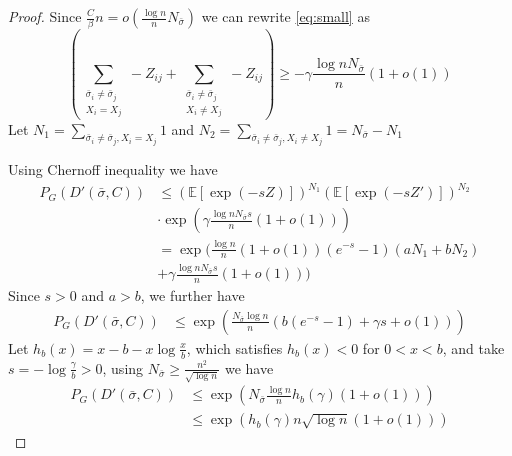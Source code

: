 \documentclass[entropy,article,submit,moreauthors,pdftex]{Definitions/mdpi}
\newcommand{\1}{\mathbbm{1}}
\begin{document}
\begin{proof}
	Since $\frac{C}{\beta} n = o(\frac{\log n}{n} N_{\bar{\sigma}})$ we can rewrite \eqref{eq:small} as
	\begin{equation}
	\left( \sum_{\substack{\bar{\sigma}_i  \neq \bar{\sigma}_j \\ X_i = X_j}} -Z_{ij}
	+ \sum_{\substack{\bar{\sigma}_i  \neq \bar{\sigma}_j \\ X_i \neq X_j}} -Z_{ij} \right)\geq -\gamma\frac{\log n N_{\bar{\sigma}}}{n}(1+o(1))
	\end{equation}
	Let $N_1 = \sum_{\bar{\sigma}_i  \neq \bar{\sigma}_j, X_i = X_j} 1$
	and $N_2 = \sum_{\bar{\sigma}_i  \neq \bar{\sigma}_j, X_i \neq X_j} 1 = N_{\bar{\sigma}} - N_1$
	
	Using Chernoff inequality we have
	\begin{align*}
	P_G(D'(\bar{\sigma}, C))&
	\leq (\mathbb{E}[\exp(-s Z )])^{N_1} (\mathbb{E}[\exp(-s Z' )])^{N_2} \\
	&\cdot \exp(\gamma \frac{\log n N_{\bar{\sigma}} s}{n}(1+o(1))) \\
	&= \exp \Big( \frac{\log n}{n}(1+o(1))(e^{-s}-1)(aN_1 + bN_2) \\
	&+\gamma \frac{\log n N_{\bar{\sigma}} s}{n}(1+o(1))\Big)
	\end{align*}
	Since $s > 0$ and $a>b$, we further have
	\begin{align*}
	P_G(D'(\bar{\sigma}, C))
	& \leq \exp( \frac{N_{\bar{\sigma}}\log n }{n}(b(e^{-s}-1)+ \gamma s + o(1))) 
	\end{align*}
	Let $h_b(x) = x - b -x\log \frac{x}{b}$, which satisfies $h_b(x) < 0$ for $0<x<b$,
	and take $s=-\log\frac{\gamma}{b} > 0$, using 
	$N_{\bar{\sigma}} \geq \frac{n^2}{\sqrt{\log n}}$ we have
	\begin{align*}
	P_G(D'(\bar{\sigma}, C))&\leq \exp( N_{\bar{\sigma}} \frac{\log n}{n} h_b(\gamma)(1+o(1))) \\
	& \leq \exp (h_b(\gamma) n \sqrt{\log n} (1+o(1)))
	\end{align*}
\end{proof}
\end{document}
